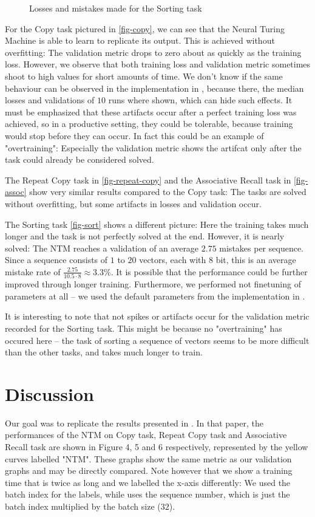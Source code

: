 \documentclass[12pt,twoside]{article}
\newcommand{\taskFigure}[1]{{\centering{
\makebox[\textwidth][c]{\texttt{[image: \#1]}}
}}}
\theoremstyle{plain}
\theoremstyle{definition}
\theoremstyle{remark}
\begin{document}
\begin{figure}\label{fig-sort}
\taskFigure{src/sorting_task.pdf}
\caption{Losses and mistakes made for the Sorting task}
\end{figure}

For the Copy task pictured in \autoref{fig-copy}, we can see that the Neural Turing Machine is able to learn to replicate its output. This is achieved without overfitting: The validation metric drops to zero about as quickly as the training loss. However, we observe that both training loss and validation metric sometimes shoot to high values for short amounts of time. We don't know if the same behaviour can be observed in the implementation in \cite{implementing-ntm}, because there, the median losses and validations of $10$ runs where shown, which can hide such effects. It must be emphasized that these artifacts occur after a perfect training loss was achieved, so in a productive setting, they could be tolerable, because training would stop before they can occur. In fact this could be an example of "overtraining": Especially the validation metric shows the artifcat only after the task could already be considered solved.

The Repeat Copy task in \autoref{fig-repeat-copy} and the Associative Recall task in \autoref{fig-assoc} show very similar results compared to the Copy task: The tasks are solved without overfitting, but some artifacts in losses and validation occur. 

The Sorting task  \autoref{fig-sort} shows a different picture: Here the training takes much longer and the task is not perfectly solved at the end. However, it is nearly solved: The NTM reaches a validation of an average $2.75$ mistakes per sequence. Since a sequence consists of $1$ to $20$ vectors, each with $8$ bit, this is an average mistake rate of $\frac{2.75}{10.5 \cdot 8} \approx 3.3 \%$. It is possible that the performance could be further improved through longer training. Furthermore, we performed not finetuning of parameters at all -- we used the default parameters from the implementation in \citep{implementing-ntm}.

It is interesting to note that not spikes or artifacts occur for the validation metric recorded for the Sorting task. This might be because no "overtraining" has occured here -- the task of sorting a sequence of vectors seems to be more difficult than the other tasks, and takes much longer to train.

\section{Discussion}
Our goal was to replicate the results presented in \cite{implementing-ntm}. In that paper, the performances of the NTM on Copy task, Repeat Copy task and Associative Recall task are shown in Figure 4, 5 and 6 respectively, represented by the yellow curves labelled "NTM". These graphs show the same metric as our validation graphs and may be directly compared. Note however that we show a training time that is twice as long and we labelled the x-axis differently: We used the batch index for the labels, while \cite{implementing-ntm} uses the sequence number, which is just the batch index multiplied by the batch size ($32$).
\end{document}
